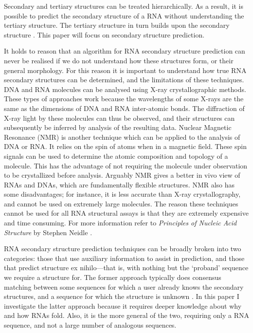 \documentclass{cshonours}
\begin{document}
Secondary and tertiary structures can be treated hierarchically. As a result, it is possible to predict the secondary structure of a RNA without understanding the tertiary structure. The tertiary structure in turn builds upon the secondary structure \cite{tinoco1999rna}. This paper will focus on secondary structure prediction.

It holds to reason that an algorithm for RNA secondary structure prediction can never be realised if we do not understand how these structures form, or their general morphology. For this reason it is important to understand how true RNA secondary structures can be determined, and the limitations of these techniques. DNA and RNA molecules can be analysed using X-ray crystallographic methods. These types of approaches work because the wavelengths of some X-rays are the same as the dimensions of DNA and RNA inter-atomic bonds. The diffraction of X-ray light by these molecules can thus be observed, and their structures can subsequently be inferred by analysis of the resulting data. Nuclear Magnetic Resonance (NMR) is another technique which can be applied to the analysis of DNA or RNA. It relies on the spin of atoms when in a magnetic field. These spin signals can be used to determine the atomic composition and topology of a molecule. This has the advantage of not requiring the molecule under observation to be crystallized before analysis. Arguably NMR gives a better in vivo view of RNAs and DNAs, which are fundamentally flexible structures. NMR also has some disadvantages; for instance, it is less accurate than X-ray crystallography, and cannot be used on extremely large molecules. The reason these techniques cannot be used for all RNA structural assays is that they are extremely expensive and time consuming. For more information refer to \emph{Principles of Nucleic Acid Structure} by Stephen Neidle \cite{neidle2010principles}.


RNA secondary structure prediction techniques can be broadly broken into two categories: those that use auxiliary information to assist in prediction, and those that predict structure ex nihilo---that is, with nothing but the `proband' sequence we require a structure for. The former approach typically does consensus matching between some sequences for which a user already knows the secondary structures, and a sequence for which the structure is unknown \cite{hofacker2008rna}. In this paper I investigate the latter approach because it requires deeper knowledge about why and how RNAs fold. Also, it is the more general of the two, requiring only a RNA sequence, and not a large number of analogous sequences.
\end{document}
